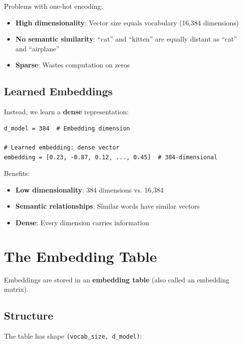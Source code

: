 Problems with one-hot encoding:
\begin{itemize}
    \item \textbf{High dimensionality}: Vector size equals vocabulary (16,384 dimensions)
    \item \textbf{No semantic similarity}: ``cat'' and ``kitten'' are equally distant as ``cat'' and ``airplane''
    \item \textbf{Sparse}: Wastes computation on zeros
\end{itemize}

\subsection{Learned Embeddings}

Instead, we learn a \textbf{dense} representation:

\begin{lstlisting}[style=python]
d_model = 384  # Embedding dimension

# Learned embedding: dense vector
embedding = [0.23, -0.87, 0.12, ..., 0.45]  # 384-dimensional
\end{lstlisting}

Benefits:
\begin{itemize}
    \item \textbf{Low dimensionality}: 384 dimensions vs. 16,384
    \item \textbf{Semantic relationships}: Similar words have similar vectors
    \item \textbf{Dense}: Every dimension carries information
\end{itemize}

\section{The Embedding Table}

Embeddings are stored in an \textbf{embedding table} (also called an embedding matrix).

\subsection{Structure}

The table has shape \texttt{(vocab\_size, d\_model)}:

